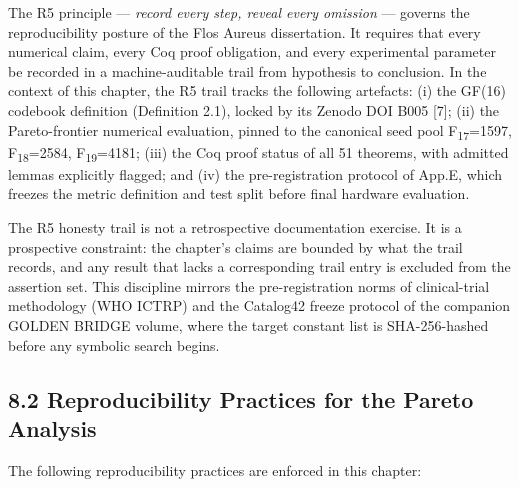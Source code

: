 The R5 principle --- \emph{record every step,
reveal every omission} --- governs the
reproducibility posture of the Flos Aureus
dissertation. It requires that every numerical
claim, every Coq proof obligation, and every
experimental parameter be recorded in a
machine-auditable trail from hypothesis to
conclusion. In the context of this chapter, the R5
trail tracks the following artefacts: (i) the GF(16)
codebook definition (Definition 2.1), locked by
its Zenodo DOI B005 [7]; (ii) the Pareto-frontier
numerical evaluation, pinned to the canonical seed
pool F\textsubscript{17}=1597,
F\textsubscript{18}=2584, F\textsubscript{19}=4181;
(iii) the Coq proof status of all 51 theorems,
with admitted lemmas explicitly flagged; and (iv)
the pre-registration protocol of App.E, which
freezes the metric definition and test split before
final hardware evaluation.

The R5 honesty trail is not a retrospective
documentation exercise. It is a prospective
constraint: the chapter's claims are bounded by
what the trail records, and any result that lacks a
corresponding trail entry is excluded from the
assertion set. This discipline mirrors the
pre-registration norms of clinical-trial
methodology (WHO ICTRP) and the Catalog42 freeze
protocol of the companion GOLDEN BRIDGE volume,
where the target constant list is SHA-256-hashed
before any symbolic search begins.

\subsection{8.2 Reproducibility Practices for the
Pareto
Analysis}\label{fa_10:reproducibility-practices}

The following reproducibility practices are
enforced in this chapter:

